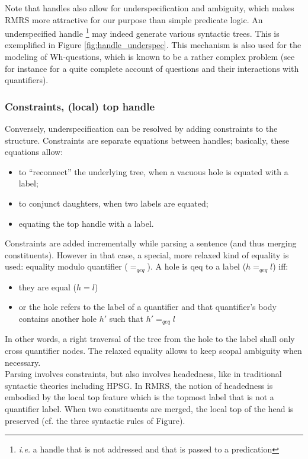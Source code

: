 \documentclass[11pt]{article}
\begin{document}
				Note that handles also allow for underspecification and ambiguity, which makes RMRS more attractive for our purpose than simple predicate logic. An underspecified handle \footnote{\textit{i.e.} a handle that is not addressed and that is passed to a predication} may indeed generate various syntactic trees. This is exemplified in Figure \ref{fig:handle_underspec}. This mechanism is also used for the modeling of Wh-questions, which is known to be a rather complex problem (see for instance \cite{egg1998} for a quite complete account of questions and their interactions with quantifiers).
			\subsubsection{Constraints, (local) top handle}
				Conversely, underspecification can be resolved by adding constraints to the structure. Constraints are separate equations between handles; basically, these equations allow:
				\begin{itemize}
					\item to ``reconnect'' the underlying tree, when a vacuous hole is equated with a label;
					\item to conjunct daughters, when two labels are equated;
					\item equating the top handle with a label.
				\end{itemize}
				Constraints are added incrementally while parsing a sentence (and thus merging constituents). However in that case, a special, more relaxed kind of equality is used: equality modulo quantifier ($=_{qeq}$). A hole is qeq to a label ($h=_{qeq}l$) iff:
				\begin{itemize}
					\item they are equal ($h = l$)
					\item or the hole refers to the label of a quantifier and that quantifier's body contains another hole $h'$ such that $h'=_{qeq} l$
				\end{itemize}
				In other words, a right traversal of the tree from the hole to the label shall only cross quantifier nodes. The relaxed equality allows to keep scopal ambiguity when necessary.\\
				Parsing involves constraints, but also involves headedness, like in traditional syntactic theories including HPSG. In RMRS, the notion of headedness is embodied by the local top feature which is the topmost label that is not a quantifier label. When two constituents are merged, the local top of the head is preserved (cf. the three syntactic rules of Figure). 
				
\end{document}
